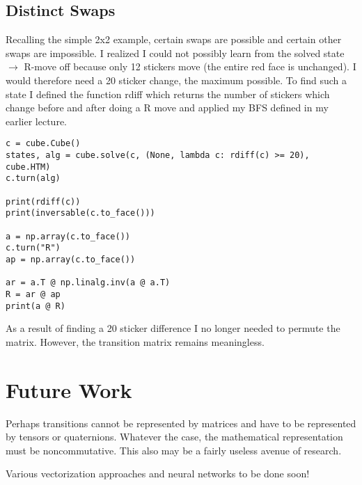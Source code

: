 \documentclass[11pt, oneside]{article}
\begin{document}
\subsection{Distinct Swaps}

Recalling the simple 2x2 example, certain swaps are possible and certain other swaps are
impossible. I realized I could not possibly learn from the solved state \( \to \) R-move off because only
12 stickers move (the entire red face is unchanged). I would therefore need a 20 sticker change, the maximum possible.
To find such a state I defined the function rdiff which returns the number of stickers which change before and after doing a R move
and applied my BFS defined in my earlier lecture.

\begin{verbatim}
c = cube.Cube()
states, alg = cube.solve(c, (None, lambda c: rdiff(c) >= 20), cube.HTM)
c.turn(alg)

print(rdiff(c))
print(inversable(c.to_face()))

a = np.array(c.to_face())
c.turn("R")
ap = np.array(c.to_face())

ar = a.T @ np.linalg.inv(a @ a.T)
R = ar @ ap
print(a @ R)
\end{verbatim}

As a result of finding a 20 sticker difference I no longer needed to permute the matrix. However, the transition matrix remains meaningless.

\section{Future Work}

Perhaps transitions cannot be represented by matrices and have to be represented by tensors or quaternions.
Whatever the case, the mathematical representation must be noncommutative. This also may be a fairly useless avenue of research.

Various vectorization approaches and neural networks to be done soon!
\end{document}
